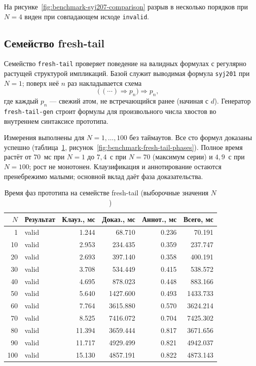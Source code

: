 \documentclass[14pt, russian]{scrartcl}
\begin{document}
На рисунке~\ref{fig:benchmark-syj207-comparison} разрыв в несколько порядков при $N = 4$ виден при совпадающем исходе \texttt{invalid}.

\subsection{Семейство fresh-tail}

Семейство \texttt{fresh-tail} проверяет поведение на валидных формулах с
регулярно растущей структурой импликаций. Базой служит выводимая формула
\texttt{syj201} при $N = 1$; поверх неё $n$ раз накладывается схема
\[
  \bigl(\,(\cdots) \Rightarrow p_n\bigr) \Rightarrow p_n,
\]
где каждый $p_n$ --- свежий атом, не встречающийся ранее (начиная с $d$).
Генератор \texttt{fresh-tail-gen} строит формулы для произвольного числа
хвостов во внутреннем синтаксисе прототипа.

Измерения выполнены для $N = 1, \ldots, 100$ без таймаутов. Все сто формул
доказаны успешно (таблица~\ref{tab:benchmark-fresh-tail-family},
рисунок~\ref{fig:benchmark-fresh-tail-phases}). Полное время растёт от
$70$~мс при $N = 1$ до $7{,}4$~с при $N = 70$ (максимум серии) и $4{,}9$~с
при $N = 100$; рост не монотонен. Клаузификация и аннотирование остаются
пренебрежимо малыми; основной вклад даёт фаза доказательства.

\begin{table}[!htb]
\centering
\caption{Время фаз прототипа на семействе fresh-tail (выборочные значения $N$)}
\label{tab:benchmark-fresh-tail-family}
\small
\begin{tabular}{|r|l|r|r|r|r|}
\hline
$N$ & Результат & Клауз., мс & Доказ., мс & Аннот., мс & Всего, мс \\
\hline
1 & valid & 1.244 & 68.710 & 0.236 & 70.191 \\
10 & valid & 2.953 & 234.435 & 0.359 & 237.747 \\
20 & valid & 2.693 & 397.140 & 0.358 & 400.191 \\
30 & valid & 3.708 & 534.449 & 0.415 & 538.572 \\
40 & valid & 4.695 & 878.023 & 0.448 & 883.166 \\
50 & valid & 5.640 & 1427.600 & 0.493 & 1433.733 \\
60 & valid & 7.764 & 3615.880 & 0.570 & 3624.214 \\
70 & valid & 8.525 & 7416.072 & 0.704 & 7425.302 \\
80 & valid & 11.394 & 3659.444 & 0.817 & 3671.656 \\
90 & valid & 11.717 & 4929.499 & 0.821 & 4942.037 \\
100 & valid & 15.130 & 4857.191 & 0.822 & 4873.143 \\
\hline
\end{tabular}
\end{table}
\end{document}
